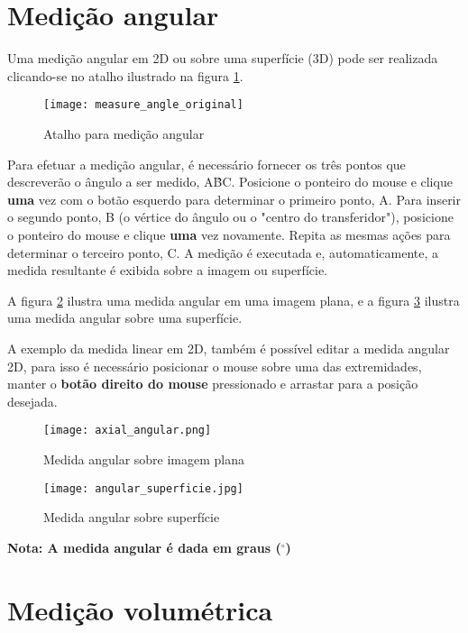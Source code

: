 \section{Medição angular}

Uma medição angular em 2D ou sobre uma superfície (3D) pode ser realizada clicando-se
no atalho ilustrado na figura \ref{fig:atalho_angular}.

\begin{figure}[!htb]
\centering
\texttt{[image: measure\_angle\_original]}
\caption{Atalho para medição angular}
\label{fig:atalho_angular}
\end{figure}

Para efetuar a medição angular, é necessário fornecer os três pontos que descreverão o
ângulo a ser medido, A\^{B}C. Posicione o ponteiro do mouse e clique \textbf{uma} vez
com o botão esquerdo para determinar o primeiro ponto, A. Para inserir o segundo ponto,
B (o vértice do ângulo ou o "centro do transferidor"), posicione o ponteiro do mouse e
clique \textbf{uma} vez novamente. Repita as mesmas ações para determinar o terceiro
ponto, C. A medição é executada e, automaticamente, a medida resultante é exibida sobre
a imagem ou superfície.

A figura \ref{fig:axial_angular} ilustra uma medida angular em uma imagem plana, e a
figura \ref{fig:axial_superficie} ilustra uma medida angular sobre uma superfície.

A exemplo da medida linear em 2D, também é possível editar a medida angular 2D, para isso é necessário posicionar o mouse sobre uma das extremidades, manter o \textbf{botão direito do mouse} pressionado e arrastar para a posição desejada.

\begin{figure}[!htb]
\centering
\texttt{[image: axial\_angular.png]}
\caption{Medida angular sobre imagem plana}
\label{fig:axial_angular}
\end{figure}

\begin{figure}[!htb]
\centering
\texttt{[image: angular\_superficie.jpg]}
\caption{Medida angular sobre superfície}
\label{fig:axial_superficie}
\end{figure}

\textbf{Nota: A medida angular é dada em graus ($^{\circ}$)}


\section{Medição volumétrica}

